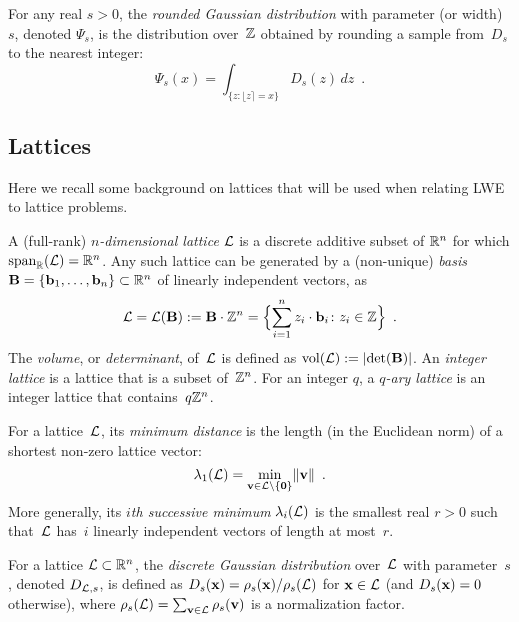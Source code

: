 \begin{definition}%
  \label{def:rounded-gaussian}
  For any real $s > 0$, the \emph{rounded Gaussian distribution} with
  parameter (or width)~$s$, denoted $\Psi_s$, is the distribution
  over~$\bbZ$ obtained by rounding a sample from~$D_{s}$ to the
  nearest integer:
  \begin{equation*}
    \Psi_s(x) = \int_{\{z\colon \lfloor z \rceil =
      x\}} D_s(z) \, dz \enspace .
  \end{equation*}
\end{definition}

\subsection{Lattices}%
\label{sec:lattices}

Here we recall some background on lattices that will be used when
relating LWE to lattice problems.

\begin{definition}[Lattice]%
  \label{def:lattice}
  A (full-rank) \emph{$n$-dimensional lattice} $\calL$ is a discrete
  additive subset of $\bbR^n$ for which
  $\text{span}_{\bbR}(\calL) = \bbR^{n}$. Any such lattice can be
  generated by a (non-unique) \emph{basis}
  $\bfB = \set{ \bfb_1, \dots, \bfb_n } \subset \bbR^n$ of linearly
  independent vectors, as
  \[ \calL = \calL(\bfB) := \bfB \cdot \bbZ^n = \set[\Big]{ \sum_{i =
        1}^n z_i \cdot \bfb_i\colon z_i \in \bbZ } \enspace . \] The
  \emph{volume}, or \emph{determinant}, of~$\calL$ is defined as
  $\vol(\calL) := \abs{\det(\bfB)}$. An \emph{integer lattice} is a
  lattice that is a subset of~$\bbZ^{n}$. For an integer $q$, a
  \emph{$q$-ary lattice} is an integer lattice that
  contains~$q\bbZ^{n}$.
\end{definition}

\begin{definition}%
  \label{def:minimum-dist}
  For a lattice~$\calL$, its \emph{minimum distance} is the length (in
  the Euclidean norm) of a shortest non-zero lattice vector:
  \[ \lambda_1(\calL) = \min_{\bfv \in \calL \setminus \set{
        \mathbf{0} }} \length{ \bfv } \enspace . \]
  More generally, its \emph{$i$th successive minimum}
  $\lambda_i(\calL)$ is the smallest real $r > 0$ such that~$\calL$
  has~$i$ linearly independent vectors of length at most~$r$.
\end{definition}

\begin{definition}%
  \label{def:discrete-gaussian}
  For a lattice $\calL \subset \bbR^{n}$, the \emph{discrete Gaussian
    distribution} over~$\calL$ with parameter~$s$, denoted
  $D_{\calL,s}$, is defined as
  $D_s(\bfx) = \rho_s(\bfx) / \rho_s(\calL)$ for $\bfx \in \calL$ (and
  $D_{s}(\bfx)=0$ otherwise), where
  $\rho_s(\calL) = \sum_{\bfv \in \calL}\rho_s(\bfv)$ is a
  normalization factor.
\end{definition}

